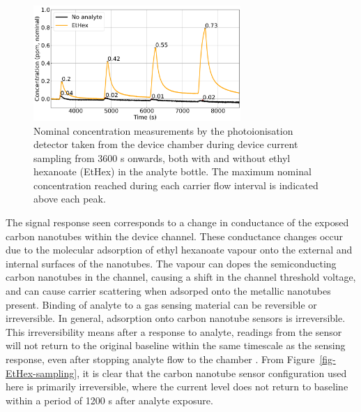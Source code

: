 \documentclass[
  a4paper,
]{scrbook}
\begin{document}
\begin{figure}

{\centering \includegraphics[width=0.7\textwidth,height=\textheight]{figures/ch6/input_time_comparison.png}

}

\caption{\label{fig-EtHex-sampling-PID}Nominal concentration
measurements by the photoionisation detector taken from the device
chamber during device current sampling from 3600 s onwards, both with
and without ethyl hexanoate (EtHex) in the analyte bottle. The maximum
nominal concentration reached during each carrier flow interval is
indicated above each peak.}

\end{figure}

The signal response seen corresponds to a change in conductance of the
exposed carbon nanotubes within the device channel. These conductance
changes occur due to the molecular adsorption of ethyl hexanoate vapour
onto the external and internal surfaces of the nanotubes. The vapour can
dopes the semiconducting carbon nanotubes in the channel, causing a
shift in the channel threshold voltage, and can cause carrier scattering
when adsorped onto the metallic nanotubes present. Binding of analyte to
a gas sensing material can be reversible or irreversible. In general,
adsorption onto carbon nanotube sensors is irreversible. This
irreversibility means after a response to analyte, readings from the
sensor will not return to the original baseline within the same
timescale as the sensing response, even after stopping analyte flow to
the chamber \autocite{Agnihotri2005,Lee2005}. From
Figure~\ref{fig-EtHex-sampling}, it is clear that the carbon nanotube
sensor configuration used here is primarily irreversible, where the
current level does not return to baseline within a period of 1200 s
after analyte exposure.
\end{document}
